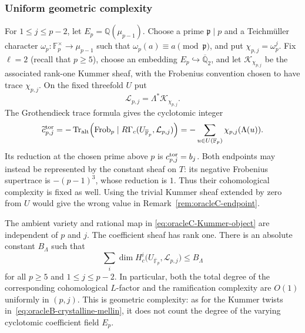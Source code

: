 \subsubsection{Uniform geometric complexity}

For $1\leq j\leq p-2$, let $E_p=\mathbb Q(\mu_{p-1})$.  Choose a prime
$\mathfrak p\mid p$ and a Teichm\"uller character
$\omega_p\colon\mathbb F_p^\times\to\mu_{p-1}$ such that
$\omega_p(a)\equiv a\pmod{\mathfrak p}$, and put
$\chi_{p,j}=\omega_p^j$.  Fix $\ell=2$ (recall that $p\geq5$), choose an
embedding $E_p\hookrightarrow\overline{\mathbb Q}_2$, and let
$\mathcal K_{\chi_{p,j}}$ be the associated rank-one Kummer sheaf, with
the Frobenius convention chosen to have trace $\chi_{p,j}$.  On the fixed
threefold $U$ put
\begin{equation}
 \mathcal L_{p,j}=\Lambda^*\mathcal K_{\chi_{p,j}}.
 \label{eq:oracleC-Kummer-object}
\end{equation}
The Grothendieck trace formula gives the cyclotomic integer
\begin{equation}
 \widetilde c_{p,j}^{\rm tor}
 =-\operatorname {Tr}_{\rm alt}\!\left(
   \operatorname {Frob}_p\mid
   R\Gamma_c(U_{\overline{\mathbb F}_p},\mathcal L_{p,j})
  \right)
 =-\sum_{u\in U(\mathbb F_p)}\chi_{p,j}(\Lambda(u)).
 \label{eq:oracleC-Frobenius-coordinate}
\end{equation}
Its reduction at the chosen prime above $p$ is
$c_{p,j}^{\rm tor}=b_j$.  Both endpoints may instead be represented by
the constant sheaf on $T$: its negative Frobenius supertrace is
$-(p-1)^3$, whose reduction is $1$.  Thus their cohomological complexity
is fixed as well.  Using the trivial Kummer sheaf extended by zero from
$U$ would give the wrong value in Remark~\ref{rem:oracleC-endpoint}.

\begin{proposition}
\label{prop:oracleC-uniform-complexity}
The ambient variety and rational map in
\eqref{eq:oracleC-Kummer-object} are independent of $p$ and $j$.  The
coefficient sheaf has rank one.  There is an absolute constant
$B_\Lambda$ such that
\begin{equation}
 \sum_i\dim H_c^i
 \bigl(U_{\overline{\mathbb F}_p},\mathcal L_{p,j}\bigr)
 \leq B_\Lambda
 \label{eq:oracleC-Betti-bound}
\end{equation}
for all $p\geq5$ and $1\leq j\leq p-2$.  In particular, both the total
degree of the corresponding cohomological $L$-factor and the ramification
complexity are $O(1)$ uniformly in $(p,j)$.  This is geometric complexity:
as for the Kummer twists in~\eqref{eq:oracleB-crystalline-mellin}, it does
not count the degree of the varying cyclotomic coefficient field $E_p$.
\end{proposition}

